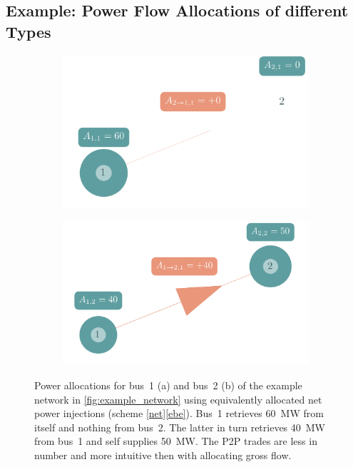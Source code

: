 \documentclass[11pt,twocolumn]{article}
\begin{document}
\subsection{Example: Power Flow Allocations of different Types}
\label{sec:example_plots}
\begin{figure}[h!]
    \begin{subfigure}[c]{\linewidth}
    \includegraphics[width=\linewidth]{example_allocation_bus1_net_ebe.png}
    \vspace{-40pt}
    \subcaption{}
    \label{fig:example_allocation_bus1_net_ebe}
    \end{subfigure}
    \begin{subfigure}[c]{\linewidth}
    \includegraphics[width=\linewidth]{example_allocation_bus2_net_ebe.png}
    \vspace{-40pt}
    \subcaption{}
    \label{fig:example_allocation_bus2_net_ebe}
    \end{subfigure}
    \caption{Power allocations for bus~1 (a) and bus~2 (b) of the example network in \cref{fig:example_network} using equivalently allocated net power injections (scheme \ref{net}\ref{ebe}). Bus~1 retrieves 60~MW from itself and nothing from bus~2. The latter in turn retrieves 40~MW from bus~1 and self supplies 50~MW. The P2P trades are less in number and more intuitive then with allocating gross flow.}
    \label{fig:example_allocation_net_ebe}
\end{figure}



\clearpage
\printbibliography
\end{document}
